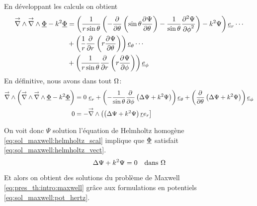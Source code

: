 % 
En développant les calculs on obtient
\begin{align*}
  \vrot \vrot \v \Phi - k^2 \v \Phi 
  &= \left(\frac{1}{r\sin\theta}\left(-\ddr{\theta}{}\left(\sin\theta\ddr{\theta}{\Psi}\right)-\frac{1}{\sin\theta}\ddr[2]{\phi}{\Psi}\right)-k^2\Psi\right)\v e_r \cdots \\
  &+ \left(\frac{1}{r}\ddr{r}{}\left(r\ddr{\theta}{\Psi}\right)\right)\v e_\theta \cdots \\
  &+ \left(\frac{1}{r\sin\theta}\ddr{r}{}\left(r\ddr{\phi}{\Psi}\right)\right)\v e_\phi
\end{align*}
En définitive, nous avons dans tout \(\OO\):
\begin{align*}
  \vrot\left(\vrot \vrot \v \Phi - k^2 \v \Phi\right) 
  &= %
   0 ~ \v e_r 
  + \left(-\frac{1}{\sin\theta}\ddr{\phi}{}\left(\Delta \Psi + k^2 \Psi \right)\right)\v e_\theta 
  + \left(\ddr{\theta}{}\left(\Delta \Psi + k^2 \Psi \right)\right)\v e_\phi \\
  0 &= -\vrot \left( \left(\Delta \Psi + k^2\Psi\right)\v r e_r\right]
\end{align*}

On voit donc \(\Psi\) solution l'équation de Helmholtz homogène  \eqref{eq:sol_maxwell:helmholtz_scal} implique que \(\v \Phi\) satisfait \eqref{eq:sol_maxwell:helmholtz_vect}.
\begin{equation}
  \label{eq:sol_maxwell:helmholtz_scal}
   \Delta \Psi + k^2\Psi = 0 \quad \text{dans \(\OO\)}
\end{equation}

Et alors on obtient des solutions du problème de Maxwell \eqref{eq:pres_th:intro:maxwell} grâce aux formulations en potentiels \eqref{eq:sol_maxwell:pot_hertz}.
